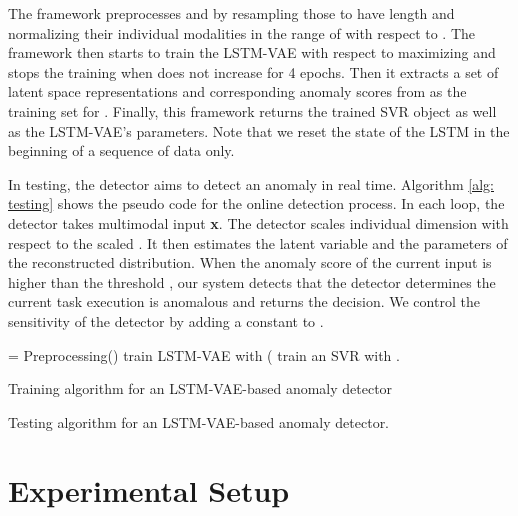 \documentclass[letterpaper, 10 pt, conference]{ieeeconf}
\newcommand{\vx}{{\bf x}}
\begin{document}
The framework preprocesses  and  by resampling those to have length  and normalizing their individual modalities in the range of  with respect to . The framework then starts to train the LSTM-VAE with respect to  maximizing  and stops the training when  does not increase for 4 epochs. Then it extracts a set of latent space representations and corresponding anomaly scores from  as the training set for . Finally, this framework returns the trained SVR object as well as the LSTM-VAE's parameters. Note that we reset the state of the LSTM in the beginning of a sequence of data only. 

In testing, the detector aims to detect an anomaly in real time. Algorithm \ref{alg: testing} shows the pseudo code for the online detection process. In each loop, the detector takes multimodal input \vx. The detector scales individual dimension with respect to the scaled . It then estimates the latent variable and the parameters of the reconstructed distribution. When the anomaly score of the current input is higher than the threshold , our system detects that the detector determines the current task execution is anomalous and returns the decision. We control the sensitivity of the detector by adding a constant  to .


\begin{algorithm}
 \Input{, }
 \Output{, , }
 \BlankLine
 = Preprocessing() \;
 train LSTM-VAE with (\;
 \;
 train an SVR with .
 \caption{Training algorithm for an LSTM-VAE-based anomaly detector}\label{alg: training}
\end{algorithm}

\begin{algorithm}
 \Input{}
 \BlankLine
 \caption{Testing algorithm for an LSTM-VAE-based anomaly detector.}\label{alg: testing}
\end{algorithm}



\section{Experimental Setup}
\end{document}
